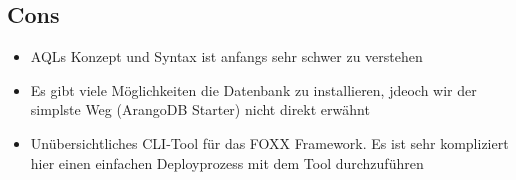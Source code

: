 
\subsection{Cons}
\begin{itemize}
\item \ac{AQL}s Konzept und Syntax ist anfangs sehr schwer zu verstehen
\item Es gibt viele Möglichkeiten die Datenbank zu installieren, jdeoch wir der simplste Weg (ArangoDB Starter) nicht direkt erwähnt
\item Unübersichtliches \ac{CLI}-Tool für das FOXX Framework. Es ist sehr kompliziert hier einen einfachen Deployprozess mit dem Tool  durchzuführen
\end{itemize}